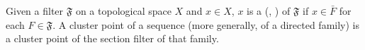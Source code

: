 Given a filter $\mathfrak{F}$ on a topological space $X$ and $x \in X$, $x$ is a  (, ) of $\mathfrak{F}$ if $x \in \bar{F}$ for each $F \in \mathfrak{F}$. A cluster point of a sequence (more generally, of a directed family) is a cluster point of the section filter of that family.
